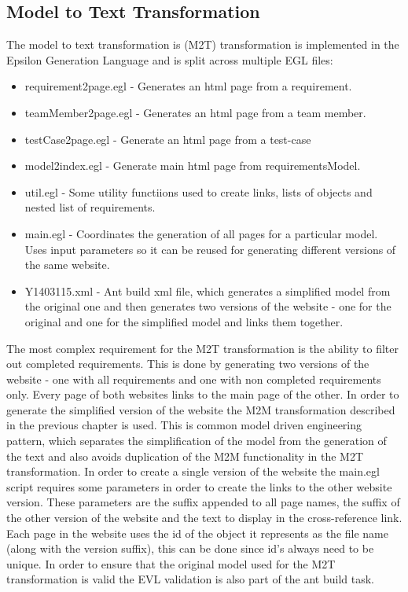 \documentclass[11pt,a4paper]{article}
\begin{document}
	\subsection{Model to Text Transformation}
	The model to text transformation is (M2T) transformation is implemented in the Epsilon Generation Language \cite{egl} and is split across multiple EGL files:
	\begin{itemize}[noitemsep]
		
		\item requirement2page.egl - Generates an html page from a requirement.
		\item teamMember2page.egl  - Generates an html page from a team member.
		\item testCase2page.egl - Generate an html page from a test-case
		\item model2index.egl - Generate main html page from requirementsModel.
		\item util.egl - Some utility functiions used to create links, lists of objects and nested list of requirements.
		\item main.egl - Coordinates the generation of all pages for a particular model. Uses input parameters so it can be reused for generating different versions of the same website.
		\item Y1403115.xml - Ant build xml file, which generates a simplified model from the original one and then generates two versions of the website - one for the original and one for the simplified model and links them together.
	\end{itemize}

	The most complex requirement for the M2T transformation is the ability to filter out completed requirements. This is done by generating two versions of the website - one with all requirements and one with non completed requirements only. Every page of both websites links to the main page of the other. In order to generate the simplified version of the website the M2M transformation described in the previous chapter is used. This is common model driven engineering pattern, which separates the simplification of the model from the generation of the text and also avoids duplication of the M2M functionality in the M2T transformation. In order to create a single version of the website the main.egl script requires some parameters in order to create the links to the other website version. These parameters are the suffix appended to all page names, the suffix of the other version of the website and the text to display in the cross-reference link. Each page in the website uses the id of the object it represents as the file name (along with the version suffix), this can be done since id's always need to be unique. In order to ensure that the original model used for the M2T transformation is valid the EVL validation is also part of the ant build task.
	
\end{document}
